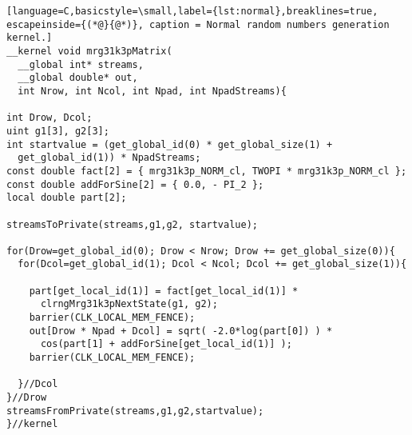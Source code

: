 \documentclass[article,nojss]{jss}\usepackage[]{graphicx}\usepackage[]{color}
\begin{document}
\begin{lstlisting}[language=C,basicstyle=\small,label={lst:normal},breaklines=true, escapeinside={(*@}{@*)}, caption = Normal random numbers generation kernel.]
__kernel void mrg31k3pMatrix(
  __global int* streams,
  __global double* out,
  int Nrow, int Ncol, int Npad, int NpadStreams){

int Drow, Dcol;
uint g1[3], g2[3];
int startvalue = (get_global_id(0) * get_global_size(1) + 
  get_global_id(1)) * NpadStreams;
const double fact[2] = { mrg31k3p_NORM_cl, TWOPI * mrg31k3p_NORM_cl };
const double addForSine[2] = { 0.0, - PI_2 };
local double part[2];

streamsToPrivate(streams,g1,g2, startvalue);

for(Drow=get_global_id(0); Drow < Nrow; Drow += get_global_size(0)){
  for(Dcol=get_global_id(1); Dcol < Ncol; Dcol += get_global_size(1)){
        
    part[get_local_id(1)] = fact[get_local_id(1)] * 
      clrngMrg31k3pNextState(g1, g2);
    barrier(CLK_LOCAL_MEM_FENCE);
    out[Drow * Npad + Dcol] = sqrt( -2.0*log(part[0]) ) * 
      cos(part[1] + addForSine[get_local_id(1)] );
    barrier(CLK_LOCAL_MEM_FENCE);
    
  }//Dcol
}//Drow
streamsFromPrivate(streams,g1,g2,startvalue);
}//kernel
\end{lstlisting}

\end{document}
